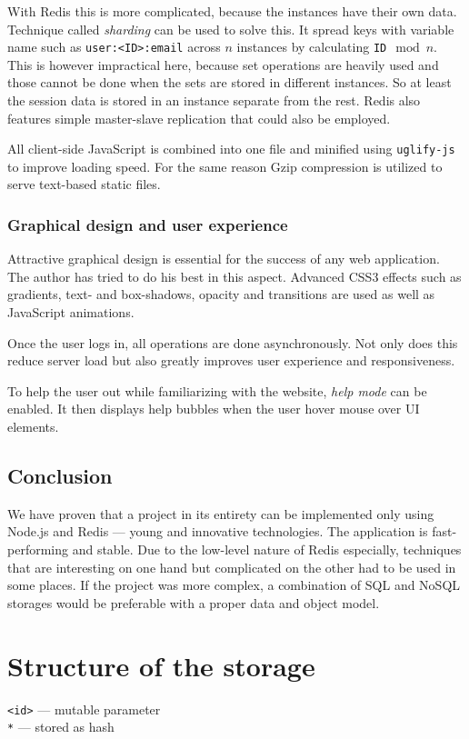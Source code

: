 \documentclass[12pt,oneside]{fithesis}
\begin{document}
		With Redis this is more complicated, because the instances have their own data. Technique called \emph{sharding} can be used to solve this. It spread keys with variable name such as \texttt{user:<ID>:email} across $n$ instances by calculating \texttt{ID}$\mod{n}$. This is however impractical here, because set operations are heavily used and those cannot be done when the sets are stored in different instances. So at least the session data is stored in an instance separate from the rest. Redis also features simple master-slave replication that could also be employed.
		
		All client-side JavaScript is combined into one file and minified using \texttt{uglify-js} to improve loading speed. For the same reason Gzip compression is utilized to serve text-based static files.
	\subsection{Graphical design and user experience}
		Attractive graphical design is essential for the success of any web application. The author has tried to do his best in this aspect. Advanced CSS3 effects such as gradients, text- and box-shadows, opacity and transitions are used as well as JavaScript animations.
		
		Once the user logs in, all operations are done asynchronously. Not only does this reduce server load but also greatly improves user experience and responsiveness.
		
		To help the user out while familiarizing with the website, \emph{help mode} can be enabled. It then displays help bubbles when the user hover mouse over UI elements.
	\section{Conclusion}
		We have proven that a project in its entirety can be implemented only using Node.js and Redis --- young and innovative technologies. The application is fast-performing and stable. Due to the low-level nature of Redis especially, techniques that are interesting on one hand but complicated on the other had to be used in some places. If the project was more complex, a combination of SQL and NoSQL storages would be preferable with a proper data and object model.

\appendix
\chapter{Structure of the storage}
\label{appendix:scheme}
\texttt{<id>} --- mutable parameter\\
\texttt{*} --- stored as hash
\inputminted[fontsize=\footnotesize]{yaml}{scheme.txt}


\end{document}
